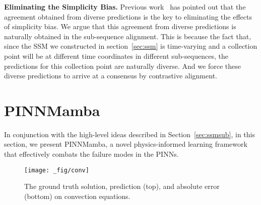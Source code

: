 \textbf{Eliminating the Simplicity Bias.} Previous work~\cite{teney2022evading,pagliardiniagree} has pointed out that the agreement obtained from diverse predictions is the key to eliminating the effects of simplicity bias. We argue that this agreement from diverse predictions is naturally obtained in the sub-sequence alignment. This is because the fact that,
    since the SSM we constructed in section~\ref{sec:ssm} is time-varying and a collection point will be at different time coordinates in different sub-sequences, the predictions for this collection point are naturally diverse. And we force these diverse predictions to arrive at a consensus by contrastive alignment.




\section{PINNMamba}

In conjunction with the high-level ideas described in Section~\ref{sec:ssmsub}, in this section, we present PINNMamba, a novel physics-informed learning framework that effectively combats the failure modes in the PINNs.


\begin{figure*}[t!]
    \centering
    \texttt{[image: \_fig/conv]}
    \vspace{-8mm}
    \caption{The ground truth solution, prediction (top), and absolute error (bottom) on convection equations.}
    \label{fig:conv}
    \vspace{-5mm}
\end{figure*}



